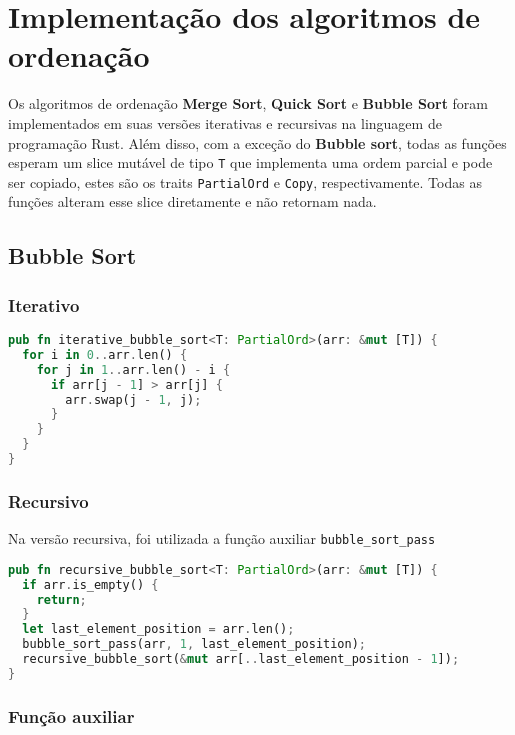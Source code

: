 \section{Implementação dos algoritmos de ordenação}
\label{sec:impl-algo-ord}

Os algoritmos de ordenação \textbf{Merge Sort}, \textbf{Quick Sort} e \textbf{Bubble Sort} foram implementados em suas versões iterativas e recursivas na linguagem de programação Rust. Além disso, com a exceção do \textbf{Bubble sort}, todas as funções esperam um slice mutável de tipo \texttt{T} que implementa uma ordem parcial e pode ser copiado, estes são os traits \texttt{PartialOrd} e \texttt{Copy}, respectivamente. Todas as funções alteram esse slice diretamente e não retornam nada.

\subsection{Bubble Sort}

\subsubsection{Iterativo}

\begin{lstlisting}[language=Rust]
pub fn iterative_bubble_sort<T: PartialOrd>(arr: &mut [T]) {
  for i in 0..arr.len() {
    for j in 1..arr.len() - i {
      if arr[j - 1] > arr[j] {
        arr.swap(j - 1, j);
      }
    }
  }
}
\end{lstlisting}

\subsubsection{Recursivo}

Na versão recursiva, foi utilizada a função auxiliar \texttt{bubble\_sort\_pass}

\begin{lstlisting}[language=Rust]
pub fn recursive_bubble_sort<T: PartialOrd>(arr: &mut [T]) {
  if arr.is_empty() {
    return;
  }
  let last_element_position = arr.len();
  bubble_sort_pass(arr, 1, last_element_position);
  recursive_bubble_sort(&mut arr[..last_element_position - 1]);
}
\end{lstlisting}

\subsubsection{Função auxiliar}

